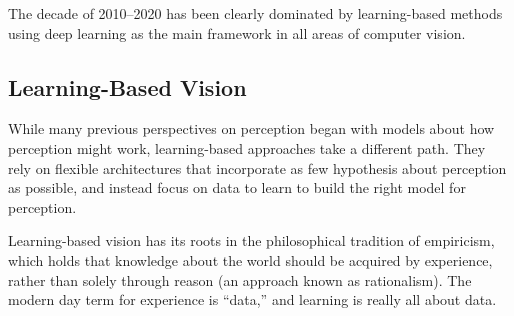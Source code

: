 
The decade of 2010--2020 has been clearly dominated by learning-based methods using deep learning as the main framework in all areas of computer vision. 

\subsection{Learning-Based Vision}



While many previous perspectives on perception began with models about how perception might 
work, learning-based approaches take a different path. They rely on flexible architectures that incorporate as few hypothesis about perception as possible, and instead focus on data to learn to build the right model for perception.

Learning-based vision has its roots in the philosophical tradition of empiricism, which holds that knowledge about the world should be acquired by experience, rather than solely through reason (an approach known as rationalism). The modern day term for experience is ``data,'' and learning is really all about data. 



